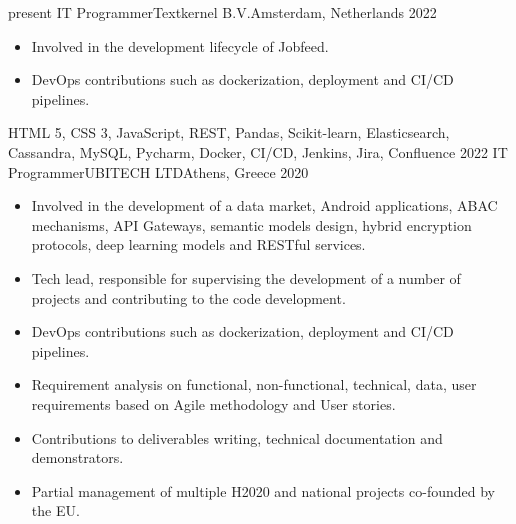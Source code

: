 \begin{experiences}
\experience
    {present}   {IT Programmer}{Textkernel B.V.}{Amsterdam, Netherlands}
    {2022} {
                    \begin{itemize}
                    
                        \item Involved in the development lifecycle of Jobfeed.
                                                        
                        \item DevOps contributions such as dockerization, deployment and CI/CD pipelines.

                    \end{itemize}
                    }
                    {HTML 5, CSS 3, JavaScript, REST, Pandas, Scikit-learn, Elasticsearch, Cassandra, MySQL, Pycharm, Docker, CI/CD, Jenkins, Jira, Confluence}
\emptySeparator
\experience
    {2022}   {IT Programmer}{UBITECH LTD}{Athens, Greece}
    {2020} {
                    \begin{itemize}
                    
                        \item Involved in the development of a data market, Android applications, ABAC mechanisms, API Gateways,
                                                        semantic models design, hybrid encryption protocols, deep learning models and RESTful services.
                                                        
                        \item Tech lead, responsible for supervising the development of a number of projects and contributing to the code development.
                        
                        \item DevOps contributions such as dockerization, deployment and CI/CD pipelines.

                        \item Requirement analysis on functional, non-functional, technical, data, user requirements based on Agile methodology and User stories.
                        
                        \item Contributions to deliverables writing, technical documentation and demonstrators.
                        
                        \item Partial management of multiple H2020 and national projects co-founded by the EU.


\end{itemize}}
\end{experiences}
